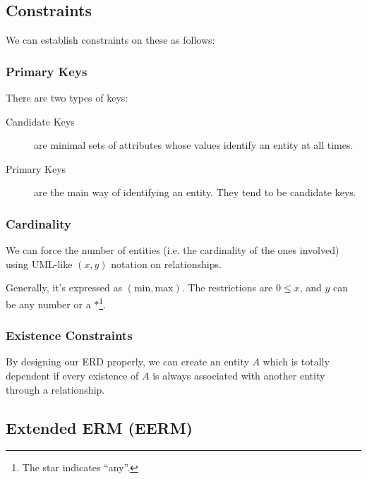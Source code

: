                 \subsection{Constraints} %
                \label{sub:constraints}
                    We can establish constraints on these as follows:
                    \subsubsection{Primary Keys} %
                    \label{ssub:primary_keys}
                        There are two types of keys:
                        \begin{description}
                            \item[Candidate Keys] are minimal sets of attributes whose values identify an entity at all times.
                            \item[Primary Keys] are the main way of identifying an entity.
                            They tend to be candidate keys.
                        \end{description}
                    \subsubsection{Cardinality} %
                    \label{ssub:cardinality}
                        We can force the number of entities (i.e. the cardinality of the ones involved) using UML-like $(x, y)$ notation on relationships.

                        Generally, it's expressed as $(\text{min}, \text{max})$.
                        The restrictions are $0\le x$, and $y$ can be any number or a $*$\footnote{The star indicates ``any''.}.
                    \subsubsection{Existence Constraints} %
                    \label{ssub:existence_constraints}
                        By designing our ERD properly, we can create an entity $A$ which is totally dependent if every existence of $A$ is always associated with another entity through a relationship.
                \subsection{Extended ERM (EERM)} %
                \label{sub:extended_erm}
